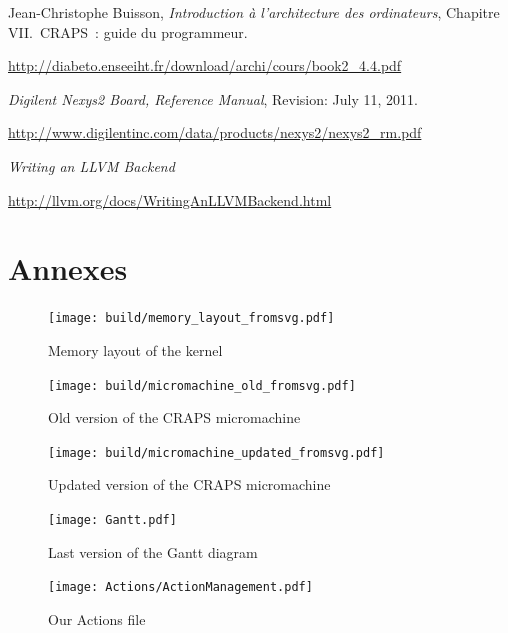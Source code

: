 \documentclass[openany, a4paper]{book}
\begin{document}
  \setcounter{chapter}{0}
  \renewcommand{\thechapter}{\Alph{chapter}}

  \patchcmd{\thebibliography}{\chapter*}{\chapter}{}{}
  \begin{thebibliography}{9}
      Jean-Christophe Buisson,
      \emph{Introduction à l'architecture des ordinateurs},
      Chapitre VII.\ CRAPS~: guide du programmeur.

      \mbox{\url{http://diabeto.enseeiht.fr/download/archi/cours/book2_4.4.pdf}}

      \emph{Digilent Nexys2 Board, Reference Manual},
      Revision: July 11, 2011.

      \mbox{\url{http://www.digilentinc.com/data/products/nexys2/nexys2_rm.pdf}}

      \emph{Writing an LLVM Backend}

      \mbox{\url{http://llvm.org/docs/WritingAnLLVMBackend.html}}
  \end{thebibliography}

  \chapter{Annexes}
    \begin{figure}
      \centering
      \texttt{[image: build/memory\_layout\_fromsvg.pdf]}
      \caption{Memory layout of the kernel}\label{fig:memory}
    \end{figure}

    \begin{figure}
      \centering
      \texttt{[image: build/micromachine\_old\_fromsvg.pdf]}
      \caption{Old version of the CRAPS micromachine}
    \end{figure}

    \begin{figure}
      \centering
      \texttt{[image: build/micromachine\_updated\_fromsvg.pdf]}
      \caption{Updated version of the CRAPS micromachine}
    \end{figure}

    \begin{figure}
      \centering
      \texttt{[image: Gantt.pdf]}
      \caption{Last version of the Gantt diagram}\label{fig:gantt}
    \end{figure}

    \begin{figure}
        \centering
        \texttt{[image: Actions/ActionManagement.pdf]}
        \caption{Our Actions file}\label{ActionFile}
    \end{figure}
\end{document}
